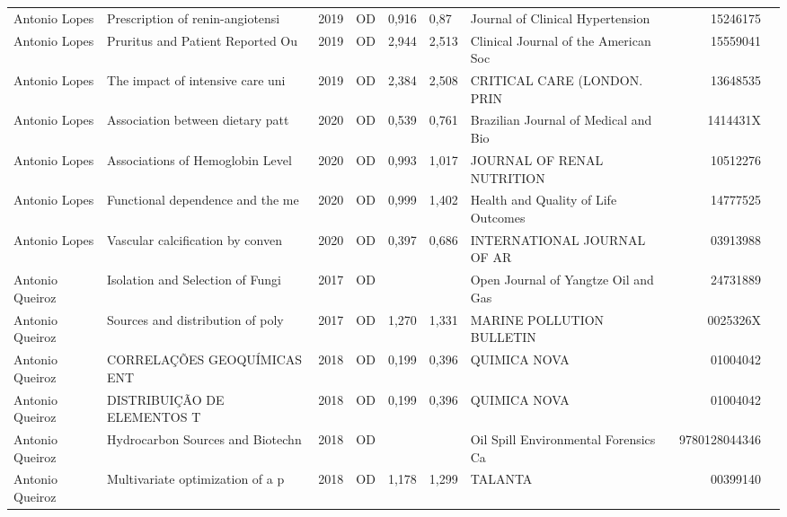 \documentclass[12pt,brazil]{article}\usepackage[]{graphicx}\usepackage[]{xcolor}
\begin{document}
\begin{longtable}{lllrrllrr}
Antonio Lopes & Prescription of renin-angiotensi & 2019 & OD & 0,916 & 0,87 & Journal of Clinical Hypertension & 15246175 \\
Antonio Lopes & Pruritus and Patient Reported Ou & 2019 & OD & 2,944 & 2,513 & Clinical Journal of the American Soc & 15559041 \\
Antonio Lopes & The impact of intensive care uni & 2019 & OD & 2,384 & 2,508 & CRITICAL CARE (LONDON. PRIN & 13648535 \\
Antonio Lopes & Association between dietary patt & 2020 & OD & 0,539 & 0,761 & Brazilian Journal of Medical and Bio & 1414431X \\
Antonio Lopes & Associations of Hemoglobin Level & 2020 & OD & 0,993 & 1,017 & JOURNAL OF RENAL NUTRITION & 10512276 \\
Antonio Lopes & Functional dependence and the me & 2020 & OD & 0,999 & 1,402 & Health and Quality of Life Outcomes & 14777525 \\
Antonio Lopes & Vascular calcification by conven & 2020 & OD & 0,397 & 0,686 & INTERNATIONAL JOURNAL OF AR & 03913988 \\
\rowcolor{coautr}\rowcolor{coautr}\rowcolor{coautr}\rowcolor{coautr}\rowcolor{coautr}\rowcolor{coautr}\rowcolor{coautr}\rowcolor{coautr}\rowcolor{coautr}\rowcolor{coautr}\rowcolor{coautr}\rowcolor{coautr}\rowcolor{coautr}\rowcolor{coautr}\rowcolor{coautr}\rowcolor{coautr}Antonio Queiroz & Isolation and Selection of Fungi & 2017 & OD &  &  & Open Journal of Yangtze Oil and Gas & 24731889 \\
Antonio Queiroz & Sources and distribution of poly & 2017 & OD & 1,270 & 1,331 & MARINE POLLUTION BULLETIN & 0025326X \\
Antonio Queiroz & CORRELAÇÕES GEOQUÍMICAS ENT & 2018 & OD & 0,199 & 0,396 & QUIMICA NOVA & 01004042 \\
\rowcolor{coautr}\rowcolor{coautr}\rowcolor{coautr}\rowcolor{coautr}\rowcolor{coautr}\rowcolor{coautr}\rowcolor{coautr}\rowcolor{coautr}\rowcolor{coautr}\rowcolor{coautr}\rowcolor{coautr}\rowcolor{coautr}\rowcolor{coautr}\rowcolor{coautr}\rowcolor{coautr}\rowcolor{coautr}Antonio Queiroz & DISTRIBUIÇÃO DE ELEMENTOS T & 2018 & OD & 0,199 & 0,396 & QUIMICA NOVA & 01004042 \\
Antonio Queiroz & Hydrocarbon Sources and Biotechn & 2018 & OD &  &  & Oil Spill Environmental Forensics Ca & 9780128044346 \\
Antonio Queiroz & Multivariate optimization of a p & 2018 & OD & 1,178 & 1,299 & TALANTA & 00399140 \\

\end{longtable}
\end{document}
